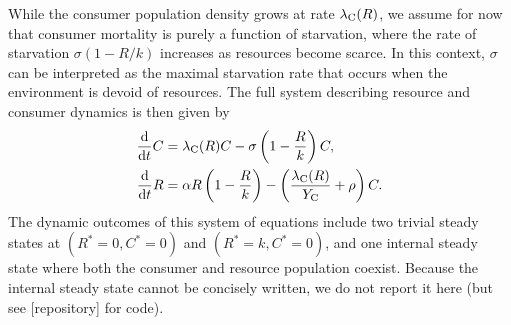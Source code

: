 \documentclass[11pt]{article}
\begin{document}
While the consumer population density grows at rate $\lambda_{\rm C}(R)$, we assume for now that consumer mortality is purely a function of starvation, where the rate of starvation $\sigma(1-R/k)$ increases as resources become scarce.
In this context, $\sigma$ can be interpreted as the maximal starvation rate that occurs when the environment is devoid of resources.
The full system describing resource and consumer dynamics is then given by
\begin{align}
    \frac{{\rm d}}{{\rm d}t}C &= \lambda_{\rm C}(R)C- \sigma \left(1 - \frac{R}{k} \right)C, \nonumber \\ 
    \frac{{\rm d}}{{\rm d}t}R &= \alpha R \left(1 - \frac{R}{k} \right) - \left(\frac{\lambda_{\rm C}(R)}{Y_{\rm C}} + \rho \right)C.
    \label{eq:2d}
\end{align}
The dynamic outcomes of this system of equations include two trivial steady states at $(R^*=0, C^*=0)$ and $(R^*=k,C^*=0)$, and one internal steady state where both the consumer and resource population coexist.
Because the internal steady state cannot be concisely written, we do not report it here (but see [repository] for code).
\end{document}
